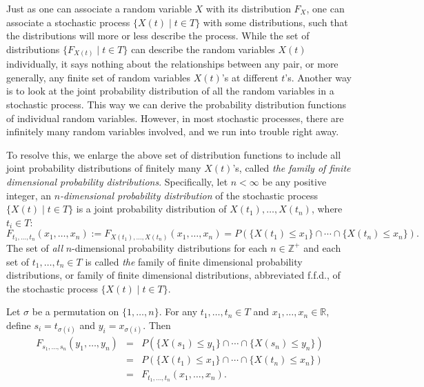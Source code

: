 \documentclass[12pt]{article}
\begin{document}
Just as one can associate a random variable $X$ with its distribution $F_X$, one can associate a stochastic process $\lbrace X(t) \mid t\in T \rbrace$ with some distributions, such that the distributions will more or less describe the process. While the set of distributions $\lbrace F_{X(t)} \mid t\in T \rbrace$ can describe the random variables $X(t)$ individually, it says nothing about the
relationships between any pair, or more generally, any finite set of random variables $X(t)$'s at different $t$'s.  Another way is to look at the joint probability distribution of all the random variables in a stochastic process.  This way we can derive the probability distribution functions of individual random variables.  However, in most stochastic processes, there are infinitely many random variables involved, and we run into trouble right away.

To resolve this, we enlarge the above set of distribution functions to include all joint probability distributions of finitely many $X(t)$'s, called \emph{the family of finite dimensional probability distributions}.  Specifically, let $n<\infty$ be any positive integer, an \emph{$n$-dimensional probability distribution} of the stochastic process  $\lbrace X(t) \mid t\in T \rbrace$ is a joint probability distribution of $X(t_1),\ldots,X(t_n)$, where $t_i\in T$:
$$F_{t_1,\ldots,t_n}(x_1,\ldots,x_n):=F_{X(t_1),\ldots,X(t_n)}(x_1,\ldots,x_n)
=P(\lbrace X(t_1)\leq x_1 \rbrace \cap \cdots \cap \lbrace
X(t_n)\leq x_n \rbrace).$$  
The set of \emph{all} $n$-dimensional probability distributions for each $n\in\mathbb{Z}^{+}$ and each set of $t_1,\ldots,t_n\in T$ is called \emph{the} family of finite dimensional probability distributions, or family of finite
dimensional distributions, abbreviated f.f.d., of the stochastic process $\lbrace X(t)\mid t\in T\rbrace$.

Let $\sigma$ be a permutation on  $\lbrace 1,\ldots, n\rbrace$.  For any $t_1,\ldots,t_n\in T$ and $x_1,\ldots,x_n\in \mathbb{R}$, define $s_i=t_{\sigma(i)}$ and $y_i=x_{\sigma(i)}$.  Then
\begin{eqnarray*}
F_{s_1,\ldots,s_n}(y_1,\ldots,y_n) &=& 
P(\lbrace X(s_1)\leq y_1 \rbrace \cap \cdots \cap \lbrace X(s_n)\leq y_n \rbrace) \\ &=&
P(\lbrace X(t_1)\leq x_1 \rbrace \cap \cdots \cap \lbrace X(t_n)\leq x_n \rbrace) \\ &=& F_{t_1,\ldots,t_n}(x_1,\ldots,x_n).
\end{eqnarray*}
\end{document}
